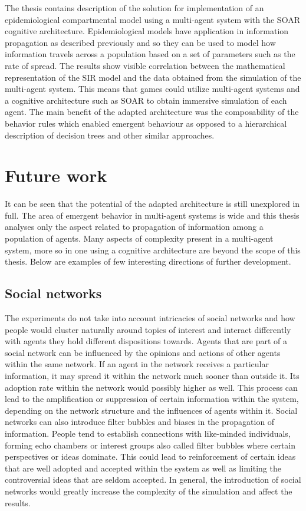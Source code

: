 \label{chapter:conclusions}

The thesis contains description of the solution for implementation of an epidemiological compartmental model using a multi-agent system with the SOAR cognitive architecture.
Epidemiological models have application in information propagation as described previously and so they can be used to model how information travels across a population based on a set of parameters such as the rate of spread.
The results show visible correlation between the mathematical representation of the SIR model and the data obtained from the simulation of the multi-agent system.
This means that games could utilize multi-agent systems and a cognitive architecture such as SOAR to obtain immersive simulation of each agent.
The main benefit of the adapted architecture was the composability of the behavior rules which enabled emergent behaviour as opposed to a hierarchical description of decision trees and other similar approaches.

\section{Future work}

It can be seen that the potential of the adapted architecture is still unexplored in full.
The area of emergent behavior in multi-agent systems is wide and this thesis analyses only the aspect related to propagation of information among a population of agents.
Many aspects of complexity present in a multi-agent system, more so in one using a cognitive architecture are beyond the scope of this thesis.
Below are examples of few interesting directions of further development.

\subsection{Social networks}

The experiments do not take into account intricacies of social networks and how people would cluster naturally around topics of interest and interact differently with agents they hold different dispositions towards.
Agents that are part of a social network can be influenced by the opinions and actions of other agents within the same network.
If an agent in the network receives a particular information, it may spread it within the network much sooner than outside it.
Its adoption rate within the network would possibly higher as well.
This process can lead to the amplification or suppression of certain information within the system, depending on the network structure and the influences of agents within it.
Social networks can also introduce filter bubbles and biases in the propagation of information.
People tend to establish connections with like-minded individuals, forming echo chambers or interest groups also called filter bubbles where certain perspectives or ideas dominate.
This could lead to reinforcement of certain ideas that are well adopted and accepted within the system as well as limiting the controversial ideas that are seldom accepted.
In general, the introduction of social networks would greatly increase the complexity of the simulation and affect the results.

